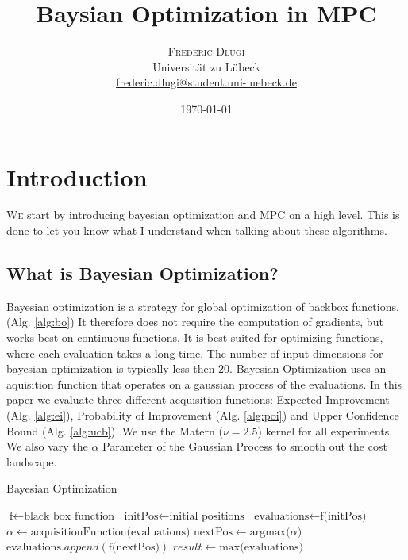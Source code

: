 \documentclass[twoside,twocolumn]{article}
\title{Baysian Optimization in MPC} %
\author{%
\textsc{Frederic Dlugi}\\[1ex] %
\normalsize Universität zu Lübeck \\ %
\normalsize \href{mailto:frederic.dlugi@student.uni-luebeck.de}{frederic.dlugi@student.uni-luebeck.de} %
}
\date{\today} %
\begin{document}
\maketitle


\section{Introduction}

\lettrine[nindent=0em,lines=3]{W} e start by introducing bayesian optimization and MPC on a high level.
This is done to let you know what I understand when talking about these algorithms.

\subsection{What is Bayesian Optimization?}
Bayesian optimization is a strategy for global optimization of backbox functions. (Alg. \ref{alg:bo})
It therefore does not require the computation of gradients, but works best on continuous functions.
It is best suited for optimizing functions, where each evaluation takes a long time.
The number of input dimensions for bayesian optimization is typically less then $20$. \cite{frazier2018tutorial}
Bayesian Optimization uses an aquisition function that operates on a gaussian process of the evaluations. In this paper we evaluate three different acquisition functions: Expected Improvement (Alg. \ref{alg:ei}), Probability of Improvement (Alg. \ref{alg:poi}) and Upper Confidence Bound (Alg. \ref{alg:ucb}). We use the Matern ($\nu=2.5$) kernel for all experiments. We also vary the $\alpha$ Parameter of the Gaussian Process to smooth out the cost landscape.

\begin{algorithm}
    \caption{Bayesian Optimization}
    \label{alg:bo}
    \begin{algorithmic}
        \State $\text{f} \gets \text{black box function}$
        \State $\text{initPos} \gets \text{initial positions}$
        \State $\text{evaluations} \gets \text{f(initPos)}$
            \State $\alpha \gets \text{acquisitionFunction(evaluations)}$
            \State $\text{nextPos} \gets \text{argmax(}\alpha\text{)}$
            \State $\text{evaluations}.append(\text{f(nextPos)})$
        \EndFor
        \State $result \gets \text{max(evaluations)}$
    \end{algorithmic}
\end{algorithm}
\end{document}
